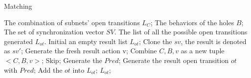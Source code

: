 \documentclass{lncs/llncs}
\begin{document}
\begin{algorithm}
\caption{Matching}
\begin{algorithmic}[1]

\Require 
The combination of subnets' open transitions $L_C$;
The behaviors of the holes $B$;
The set of synchronization vector $SV$.
\Ensure 
The list of all the possible open transitions generated $L_{ot}$.
\State Initial an empty result list $L_{ot}$;
		\State Clone the $sv$, the result is denoted as $sv'$;
		\State Generate the fresh result action v;
		\State Combine $C, B, v$ as a new tuple $<C, B, v>$;
			\State Skip;
			\Else 
			\State Generate the $Pred$;
			\EndIf
		\EndFor
		\State Generate the result open transition $ot$ with $Pred$;
		\State Add the $ot$ into $L_{ot}$;
	\EndFor
\EndFor 
\State \Return $L_{ot}$;

\end{algorithmic} 
\end{algorithm}
\end{document}

